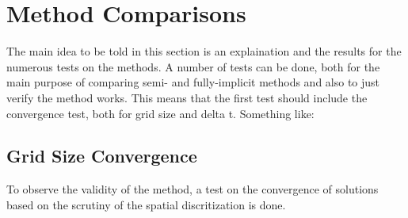 
%
%     
  
\section{Method Comparisons}

The main idea to be told in this section is an explaination and the results for the numerous tests on the methods.
A number of tests can be done, both for the main purpose of comparing semi- and fully-implicit methods and also to just verify the method works.
This means that the first test should include the convergence test, both for grid size and delta t.
Something like:
\subsection{Grid Size Convergence}
  To observe the validity of the method, a test on the convergence of solutions based on the scrutiny of the spatial discritization is done.

